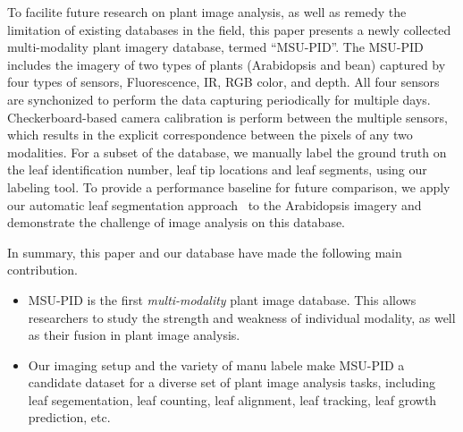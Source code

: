 To facilite future research on plant image analysis, as well as remedy the limitation of existing databases in the field, this paper presents a newly collected multi-modality plant imagery database, termed ``MSU-PID''.
The MSU-PID includes the imagery of two types of plants (Arabidopsis and bean) captured by four types of sensors, Fluorescence, IR, RGB color, and depth.
All four sensors are synchonized to perform the data capturing periodically for multiple days. 
Checkerboard-based camera calibration is perform between the multiple sensors, which results in the explicit correspondence between the pixels of any two modalities.
For a subset of the database, we manually label the ground truth on the leaf identification number, leaf tip locations and leaf segments, using our labeling tool.
To provide a performance baseline for future comparison, we apply our automatic leaf segmentation approach~\cite{yin2014a,yin2014b} to the Arabidopsis imagery and demonstrate the challenge of image analysis on this database. 
 
In summary, this paper and our database have made the following main contribution. 
\begin{itemize}
\item MSU-PID is the first {\it multi-modality} plant image database. 
This allows researchers to study the strength and weakness of individual modality, as well as their fusion in plant image analysis.
\item Our imaging setup and the variety of manu labele make MSU-PID a candidate dataset for a diverse set of plant image analysis tasks, including leaf segementation, leaf counting, leaf alignment, leaf tracking, leaf growth prediction, etc.
\end{itemize}



  